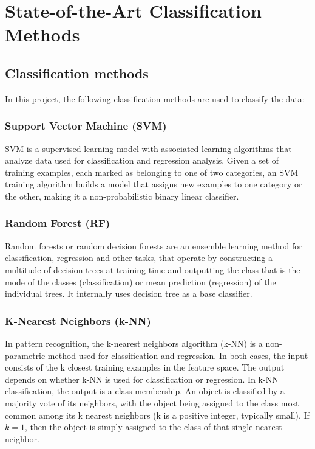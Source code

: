 \section{State-of-the-Art Classification Methods}

\subsection{Classification methods}
	In this project, the following classification methods are used to classify the data:

	\subsubsection{Support Vector Machine (SVM)}
	SVM is a supervised learning model with associated learning algorithms that analyze data used for classification and regression analysis. Given a set of training examples, each marked as belonging to one of two categories, an SVM training algorithm builds a model that assigns new examples to one category or the other, making it a non-probabilistic binary linear classifier.
	
	\subsubsection{Random Forest (RF)}
	Random forests or random decision forests are an ensemble learning method for classification, regression and other tasks, that operate by constructing a multitude of decision trees at training time and outputting the class that is the mode of the classes (classification) or mean prediction (regression) of the individual trees. It internally uses decision tree as a base classifier. 
	
	\subsubsection{K-Nearest Neighbors (k-NN)}
	In pattern recognition, the k-nearest neighbors algorithm (k-NN) is a non-parametric method used for classification and regression. In both cases, the input consists of the k closest training examples in the feature space. The output depends on whether k-NN is used for classification or regression. In k-NN classification, the output is a class membership. An object is classified by a majority vote of its neighbors, with the object being assigned to the class most common among its k nearest neighbors (k is a positive integer, typically small). If $k = 1$, then the object is simply assigned to the class of that single nearest neighbor.

